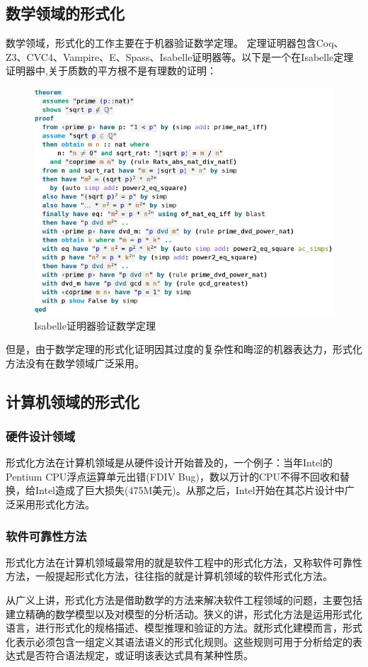 \documentclass[cs4size,a4pape,UTF8]{ctexart}
\numberwithin{equation}{section}
\numberwithin{table}{section}
\numberwithin{figure}{section}
\begin{document}
\subsection{数学领域的形式化}
数学领域，形式化的工作主要在于机器验证数学定理。
定理证明器包含Coq、Z3、CVC4、Vampire、E、Spass、Isabelle证明器等。以下是一个在Isabelle定理证明器中,关于质数的平方根不是有理数的证明：

\begin{figure}[thbp!]
\centering
\includegraphics[width=0.6\linewidth]{figure/1}
\caption{Isabelle证明器验证数学定理}
\label{fig:1}
\end{figure}
 
但是，由于数学定理的形式化证明因其过度的复杂性和晦涩的机器表达力，形式化方法没有在数学领域广泛采用\cite{math}。

\subsection{计算机领域的形式化}
\subsubsection{硬件设计领域}
形式化方法在计算机领域是从硬件设计开始普及的，一个例子：当年Intel的Pentium CPU浮点运算单元出错(FDIV Bug)，数以万计的CPU不得不回收和替换，给Intel造成了巨大损失(475M美元)。从那之后，Intel开始在其芯片设计中广泛采用形式化方法\cite{verification}。

\subsubsection{软件可靠性方法}
形式化方法在计算机领域最常用的就是软件工程中的形式化方法，又称软件可靠性方法，一般提起形式化方法，往往指的就是计算机领域的软件形式化方法。

从广义上讲，形式化方法是借助数学的方法来解决软件工程领域的问题，主要包括建立精确的数学模型以及对模型的分析活动。狭义的讲，形式化方法是运用形式化语言，进行形式化的规格描述、模型推理和验证的方法。就形式化建模而言，形式化表示必须包含一组定义其语法语义的形式化规则。这些规则可用于分析给定的表达式是否符合语法规定，或证明该表达式具有某种性质。
\end{document}

